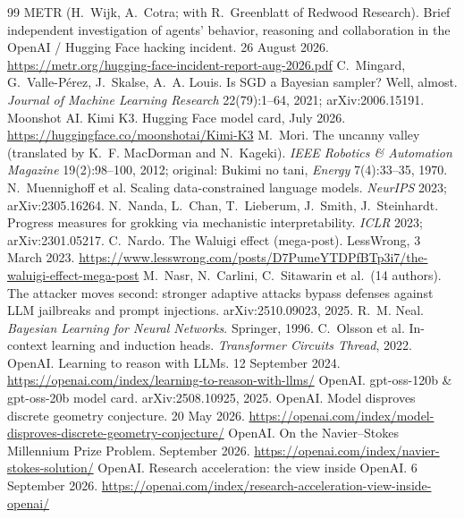 \begin{thebibliography}{99}
 METR (H.~Wijk, A.~Cotra; with R.~Greenblatt of Redwood Research). Brief independent investigation of agents' behavior, reasoning and collaboration in the OpenAI / Hugging Face hacking incident. 26 August 2026. \url{https://metr.org/hugging-face-incident-report-aug-2026.pdf}
 C.~Mingard, G.~Valle-P\'erez, J.~Skalse, A.~A. Louis. Is SGD a Bayesian sampler? Well, almost. \emph{Journal of Machine Learning Research} 22(79):1--64, 2021; arXiv:2006.15191.
 Moonshot AI. Kimi K3. Hugging Face model card, July 2026. \url{https://huggingface.co/moonshotai/Kimi-K3}
 M.~Mori. The uncanny valley (translated by K.~F. MacDorman and N.~Kageki). \emph{IEEE Robotics \& Automation Magazine} 19(2):98--100, 2012; original: Bukimi no tani, \emph{Energy} 7(4):33--35, 1970.
 N.~Muennighoff et al. Scaling data-constrained language models. \emph{NeurIPS} 2023; arXiv:2305.16264.
 N.~Nanda, L.~Chan, T.~Lieberum, J.~Smith, J.~Steinhardt. Progress measures for grokking via mechanistic interpretability. \emph{ICLR} 2023; arXiv:2301.05217.
 C.~Nardo. The Waluigi effect (mega-post). LessWrong, 3 March 2023. \url{https://www.lesswrong.com/posts/D7PumeYTDPfBTp3i7/the-waluigi-effect-mega-post}
 M.~Nasr, N.~Carlini, C.~Sitawarin et al.\ (14 authors). The attacker moves second: stronger adaptive attacks bypass defenses against LLM jailbreaks and prompt injections. arXiv:2510.09023, 2025.
 R.~M. Neal. \emph{Bayesian Learning for Neural Networks}. Springer, 1996.
 C.~Olsson et al. In-context learning and induction heads. \emph{Transformer Circuits Thread}, 2022.
 OpenAI. Learning to reason with LLMs. 12 September 2024. \url{https://openai.com/index/learning-to-reason-with-llms/}
 OpenAI. gpt-oss-120b \& gpt-oss-20b model card. arXiv:2508.10925, 2025.
 OpenAI. Model disproves discrete geometry conjecture. 20 May 2026. \url{https://openai.com/index/model-disproves-discrete-geometry-conjecture/}
 OpenAI. On the Navier--Stokes Millennium Prize Problem. September 2026. \url{https://openai.com/index/navier-stokes-solution/}
 OpenAI. Research acceleration: the view inside OpenAI. 6 September 2026. \url{https://openai.com/index/research-acceleration-view-inside-openai/}

\end{thebibliography}
